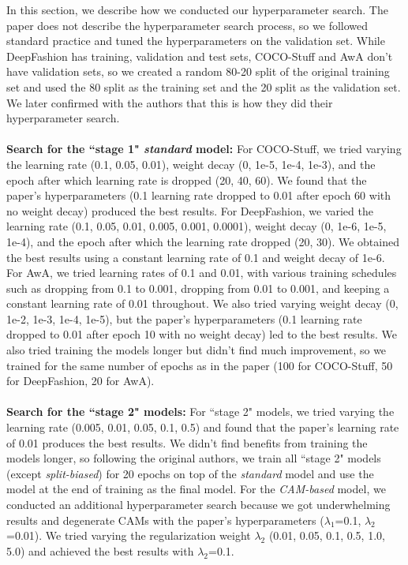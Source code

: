 In this section, we describe how we conducted our hyperparameter search. The paper does not describe the hyperparameter search process, so we followed standard practice and tuned the hyperparameters on the validation set. While DeepFashion has training, validation and test sets, COCO-Stuff and AwA don't have validation sets, so we created a random 80-20 split of the original training set and used the 80 split as the training set and the 20 split as the validation set. We later confirmed with the authors that this is how they did their hyperparameter search.\\
\\
\textbf{Search for the ``stage 1" \textit{standard} model:} For COCO-Stuff, we tried varying the learning rate (0.1, 0.05, 0.01), weight decay (0, 1e-5, 1e-4, 1e-3), and the epoch after which learning rate is dropped (20, 40, 60). We found that the paper's hyperparameters (0.1 learning rate dropped to 0.01 after epoch 60 with no weight decay) produced the best results.
For DeepFashion, we varied the learning rate (0.1, 0.05, 0.01, 0.005, 0.001, 0.0001), weight decay (0, 1e-6, 1e-5, 1e-4), and the epoch after which the learning rate dropped (20, 30). We obtained the best results using a constant learning rate of 0.1 and weight decay of 1e-6.
For AwA, we tried learning rates of 0.1 and 0.01, with various training schedules such as dropping from 0.1 to 0.001, dropping from 0.01 to 0.001, and keeping a constant learning rate of 0.01 throughout. We also tried varying weight decay (0, 1e-2, 1e-3, 1e-4, 1e-5), but the paper's hyperparameters (0.1 learning rate dropped to 0.01 after epoch 10 with no weight decay) led to the best results.
We also tried training the models longer but didn't find much improvement, so we trained for the same number of epochs as in the paper (100 for COCO-Stuff, 50 for DeepFashion, 20 for AwA).\\
\\
\textbf{Search for the ``stage 2" models:} For ``stage 2" models, we tried varying the learning rate (0.005, 0.01, 0.05, 0.1, 0.5) and found that the paper's learning rate of 0.01 produces the best results. We didn't find benefits from training the models longer, so following the original authors, we train all ``stage 2" models (except \textit{split-biased}) for 20 epochs on top of the \textit{standard} model and use the model at the end of training as the final model. For the \textit{CAM-based} model, we conducted an additional hyperparameter search because we got underwhelming results and degenerate CAMs with the paper's hyperparameters ($\lambda_1$=0.1, $\lambda_2$=0.01). We tried varying the regularization weight $\lambda_2$ (0.01, 0.05, 0.1, 0.5, 1.0, 5.0) and achieved the best results with $\lambda_2$=0.1.


